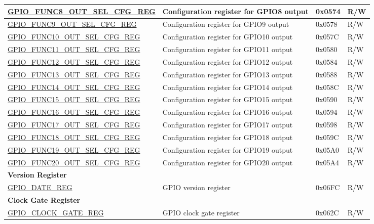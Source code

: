 \begin{longtable}{ | p{6cm} | p{7.2cm} | p{1.3cm} | p{1cm} | }
\hyperref[regdesc:GPIOFUNCNOUTSELCFGREG]{GPIO\_FUNC8\_OUT\_SEL\_CFG\_REG} & Configuration register for GPIO8 output & 0x0574 & R/W \\ \hline
\hyperref[regdesc:GPIOFUNCNOUTSELCFGREG]{GPIO\_FUNC9\_OUT\_SEL\_CFG\_REG} & Configuration register for GPIO9 output & 0x0578 & R/W \\ \hline
\hyperref[regdesc:GPIOFUNCNOUTSELCFGREG]{GPIO\_FUNC10\_OUT\_SEL\_CFG\_REG} & Configuration register for GPIO10 output & 0x057C & R/W \\ \hline
\hyperref[regdesc:GPIOFUNCNOUTSELCFGREG]{GPIO\_FUNC11\_OUT\_SEL\_CFG\_REG} & Configuration register for GPIO11 output & 0x0580 & R/W \\ \hline
\hyperref[regdesc:GPIOFUNCNOUTSELCFGREG]{GPIO\_FUNC12\_OUT\_SEL\_CFG\_REG} & Configuration register for GPIO12 output & 0x0584 & R/W \\ \hline
\hyperref[regdesc:GPIOFUNCNOUTSELCFGREG]{GPIO\_FUNC13\_OUT\_SEL\_CFG\_REG} & Configuration register for GPIO13 output & 0x0588 & R/W \\ \hline
\hyperref[regdesc:GPIOFUNCNOUTSELCFGREG]{GPIO\_FUNC14\_OUT\_SEL\_CFG\_REG} & Configuration register for GPIO14 output & 0x058C & R/W \\ \hline
\hyperref[regdesc:GPIOFUNCNOUTSELCFGREG]{GPIO\_FUNC15\_OUT\_SEL\_CFG\_REG} & Configuration register for GPIO15 output & 0x0590 & R/W \\ \hline
\hyperref[regdesc:GPIOFUNCNOUTSELCFGREG]{GPIO\_FUNC16\_OUT\_SEL\_CFG\_REG} & Configuration register for GPIO16 output & 0x0594 & R/W \\ \hline
\hyperref[regdesc:GPIOFUNCNOUTSELCFGREG]{GPIO\_FUNC17\_OUT\_SEL\_CFG\_REG} & Configuration register for GPIO17 output & 0x0598 & R/W \\ \hline
\hyperref[regdesc:GPIOFUNCNOUTSELCFGREG]{GPIO\_FUNC18\_OUT\_SEL\_CFG\_REG} & Configuration register for GPIO18 output & 0x059C & R/W \\ \hline
\hyperref[regdesc:GPIOFUNCNOUTSELCFGREG]{GPIO\_FUNC19\_OUT\_SEL\_CFG\_REG} & Configuration register for GPIO19 output & 0x05A0 & R/W \\ \hline
\hyperref[regdesc:GPIOFUNCNOUTSELCFGREG]{GPIO\_FUNC20\_OUT\_SEL\_CFG\_REG} & Configuration register for GPIO20 output & 0x05A4 & R/W \\ \hline
\multicolumn{4}{|l|}{\textbf{Version Register}} \\ \hline
\hyperref[regdesc:GPIOREGDATEREGREG]{GPIO\_DATE\_REG} & GPIO version register & 0x06FC & R/W \\ \hline

\multicolumn{4}{|l|}{\textbf{Clock Gate Register}} \\ \hline
\hyperref[regdesc:GPIOCLOCKGATEREGREG]{GPIO\_CLOCK\_GATE\_REG} & GPIO clock gate register & 0x062C & R/W \\ \hline
\end{longtable}
